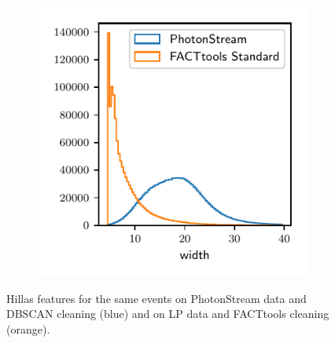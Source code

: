 \begin{figure}
\begin{subfigure}{0.5\textwidth}
  \end{subfigure}
  \begin{subfigure}{0.5\textwidth}
    \centering
  \includegraphics[width=\textwidth, page=4]{Plots/std_phs_comparison_hist_same_DBSCAN_crab.pdf}
  \end{subfigure}
  \caption{Hillas features for the same events on PhotonStream data and DBSCAN cleaning (blue) and on LP data and FACTtools cleaning (orange).}
  \label{fig:feat_comp}
\end{figure}

